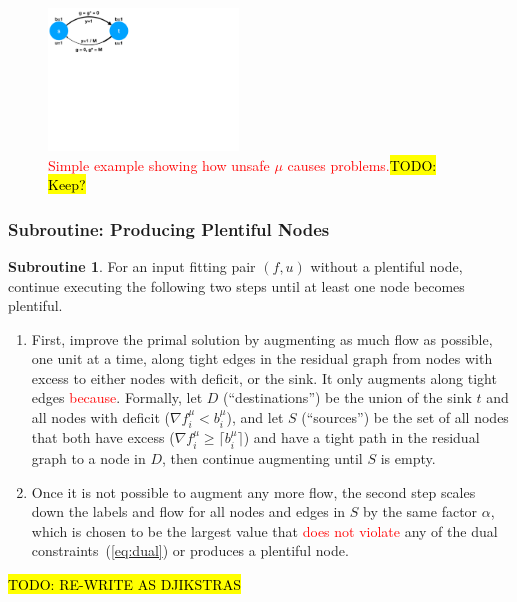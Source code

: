 \documentclass[11pt]{article}
\theoremstyle{definition}
\theoremstyle{definition}
\newtheorem{subroutine}{Subroutine}
\newcommand{\rewrite}[1]{\textcolor{red}{#1}}
\newcommand{\todo}[1]{\hl{TODO: #1}}
\begin{document}
		\begin{figure}[h]
		\centering
		\includegraphics[width=0.45\textwidth]{figs/unsafe.pdf}
		\caption{
		\label{fig:unsafe}
		\rewrite{Simple example showing how unsafe $\mu$ causes problems.}\todo{Keep?}
		}
		\end{figure}

		\subsubsection{Subroutine: Producing Plentiful Nodes}
		\label{sec:sub-ppn}
		
		\begin{subroutine}
		For an input fitting pair $(f,u)$ without a plentiful node,
		continue executing the following two steps until at least one node becomes
		plentiful.
		\begin{enumerate}
		\item First, improve the primal solution by augmenting as much flow as possible,
		one unit at a time, along tight edges in the residual graph 
		from nodes with excess to either nodes with deficit, or the sink.
		It only augments along tight edges \rewrite{because}. Formally, let
		$D$ (``destinations'') be the union of the sink $t$ and all nodes with 
		deficit ($\nabla f_i^{\mu} < b_i^{\mu}$), and let $S$ (``sources'') be
		the set of all nodes that both have excess ($\nabla f_i^{\mu} \ge \lceil b_i^{\mu} \rceil$)
		and have a tight path in the residual graph to a node in $D$, then
		continue augmenting until $S$ is empty.
		\item Once it is not possible to augment any more flow, the second step scales down
		the labels and flow for all nodes and edges in $S$ by the same factor $\alpha$,
		which is chosen to be the largest value that \rewrite{does not violate} any of the dual
		constraints~(\ref{eq:dual}) or produces a plentiful node.
		\end{enumerate}
		\end{subroutine}

		\todo{RE-WRITE AS DJIKSTRAS}
		
\end{document}
